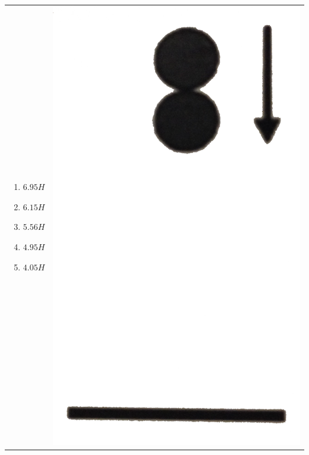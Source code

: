 \documentclass[12pt,letterpaper]{article}
\begin{document}
\begin{enumerate}[resume]
\begin{tabular}{l r}

\begin{minipage}{0.8\textwidth}
\begin{enumerate}
\item $6.95H$
\item $6.15H$
\item $5.56H$
\item $4.95H$
\item $4.05H$
\end{enumerate}
\end{minipage} &
\begin{minipage}{0.1\textwidth}
\includegraphics[width=\textwidth]{spheres.png}
\end{minipage}
\end{tabular}


\end{enumerate}
\end{document}
